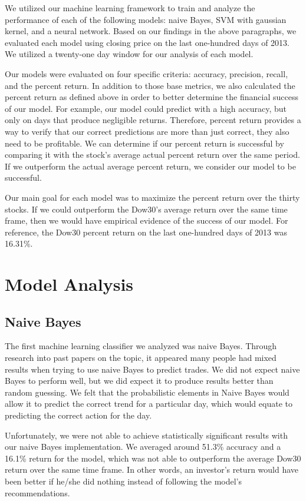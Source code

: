 \documentclass{article}
\begin{document}
We utilized our machine learning framework to train and analyze the performance of each of the following models: naive Bayes, SVM with gaussian kernel, and a neural network. Based on our findings in the above paragraphs, we evaluated each model using closing price on the last one-hundred days of 2013. We utilized a twenty-one day window for our analysis of each model.

Our models were evaluated on four specific criteria: accuracy, precision, recall, and the percent return. In addition to those base metrics, we also calculated the percent return as defined above in order to better determine the financial success of our model. For example, our model could predict with a high accuracy, but only on days that produce negligible returns. Therefore, percent return provides a way to verify that our correct predictions are more than just correct, they also need to be profitable. We can determine if our percent return is successful by comparing it with the stock's average actual percent return over the same period. If we outperform the actual average percent return, we consider our model to be successful.

Our main goal for each model was to maximize the percent return over the thirty stocks. If we could outperform the Dow30's average return over the same time frame, then we would have empirical evidence of the success of our model. For reference, the Dow30 percent return on the last one-hundred days of 2013 was 16.31\%.

\section{Model Analysis}

\subsection{Naive Bayes}
The first machine learning classifier we analyzed was naive Bayes. Through research into past papers on the topic, it appeared many people had mixed results when trying to use naive Bayes to predict trades. We did not expect naive Bayes to perform well, but we did expect it to produce results better than random guessing. We felt that the probabilistic elements in Naive Bayes would allow it to predict the correct trend for a particular day, which would equate to predicting the correct action for the day.

Unfortunately, we were not able to achieve statistically significant results with our naive Bayes implementation. We averaged around 51.3\% accuracy and a 16.1\% return for the model, which was not able to outperform the average Dow30 return over the same time frame. In other words, an investor's return would have been better if he/she did nothing instead of following the model's recommendations.
\end{document}
